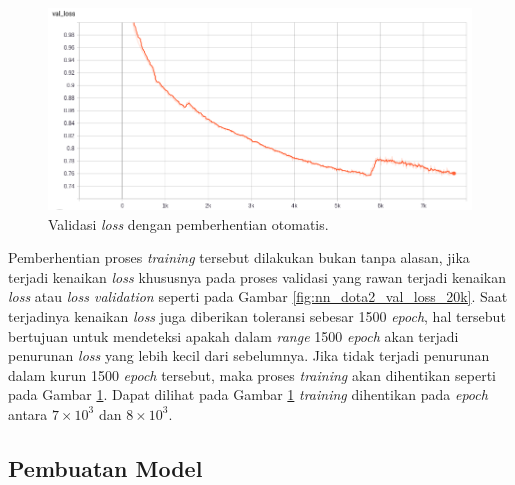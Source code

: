 \begin{figure} [!htb] \centering
	\includegraphics[scale=0.3975]{img/callback_val_loss_chap3.png}
	\caption{Validasi \textit{loss} dengan pemberhentian otomatis.}
	\label{fig:nn_dota2_val_loss_callback}
\end{figure}
\vspace{1ex}

Pemberhentian proses \textit{training} tersebut dilakukan bukan tanpa alasan, jika terjadi kenaikan \textit{loss} khususnya pada proses validasi yang rawan terjadi kenaikan \textit{loss} atau \textit{loss validation} seperti pada Gambar \ref{fig:nn_dota2_val_loss_20k}. Saat terjadinya kenaikan \textit{loss} juga diberikan toleransi sebesar 1500 \textit{epoch}, hal tersebut bertujuan untuk mendeteksi apakah dalam \textit{range} 1500 \textit{epoch} akan terjadi penurunan \textit{loss} yang lebih kecil dari sebelumnya. Jika tidak terjadi penurunan dalam kurun 1500 \textit{epoch} tersebut, maka proses \textit{training} akan dihentikan seperti pada Gambar \ref{fig:nn_dota2_val_loss_callback}. Dapat dilihat pada Gambar \ref{fig:nn_dota2_val_loss_callback} \textit{training} dihentikan pada \textit{epoch} antara $7 \times 10^{3}$ dan $8 \times 10^{3}$.
\vspace{1ex}

\subsection{Pembuatan Model}
\label{sec:sub_sec3_dota2_model}
\vspace{1ex}

